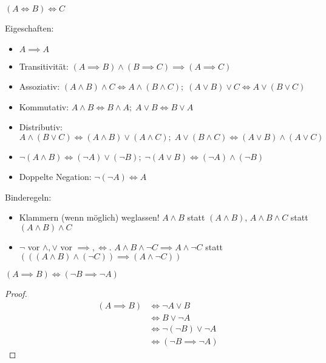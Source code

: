 \begin{remark}
  $(A \iff B) \iff C$
\end{remark}

\begin{theorem}
  Eigeschaften:
  \begin{itemize}
  \item $A \implies A$
  \item Transitivität: $(A \implies B) \wedge (B \implies C) \implies (A \implies C)$
  \item Assoziativ: $(A \wedge B) \wedge C \iff A \wedge (B \wedge C);\; (A \vee B) \vee C \iff A \vee (B \vee C)$
  \item Kommutativ: $A \wedge B \iff B \wedge A;\; A \vee B \iff B \vee A$
  \item Distributiv: $A \wedge (B \vee C) \iff (A \wedge B) \vee (A \wedge C);\; A \vee (B \wedge C) \iff (A \vee B) \wedge (A \vee C)$
  \item $\neg (A \wedge B) \iff (\neg A) \vee (\neg B);\; \neg (A \vee B) \iff (\neg A) \wedge (\neg B)$
  \item Doppelte Negation: $\neg (\neg A) \iff A$
  \end{itemize}
\end{theorem}

\begin{remark}Binderegeln:
  \begin{itemize}
  \item Klammern (wenn möglich) weglassen! $A \wedge B$ statt $(A \wedge B)$, $A \wedge B \wedge C$ statt $(A \wedge B) \wedge C$
  \item $\neg$ vor $\wedge, \vee$ vor $\implies, \iff$. $A \wedge B \wedge \neg C \implies A \wedge \neg C$ statt $(((A \wedge B) \wedge (\neg C)) \implies (A \wedge \neg C))$
  \end{itemize}
\end{remark}

\begin{corollary}
  $(A \implies B) \iff (\neg B \implies \neg A)$
\end{corollary}
\begin{proof}
  \begin{align*}
    (A \implies B) &\iff \neg A \vee B \\
    \, &\iff B \vee \neg A \\
    \, &\iff \neg (\neg B) \vee \neg A \\
    \, &\iff (\neg B \implies \neg A)
  \end{align*}
\end{proof}

